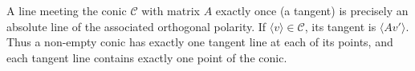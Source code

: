 A line meeting the conic $\mathcal{C}$ with matrix $A$ exactly once (a tangent) is precisely an absolute line of the associated orthogonal polarity. If $\langle v \rangle \in \mathcal{C}$, its tangent is $\langle Av' \rangle$. Thus a non-empty conic has exactly one tangent line at each of its points, and each tangent line contains exactly one point of the conic.
